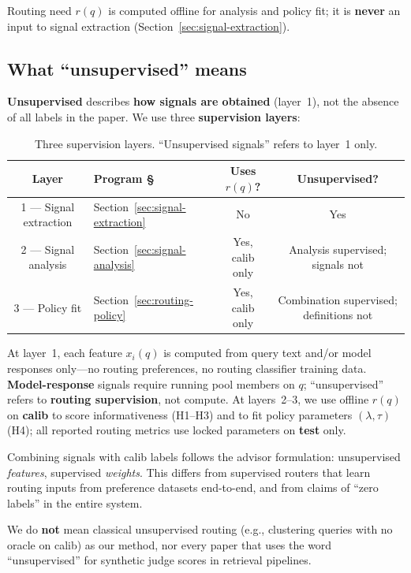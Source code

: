 Routing need $r(q)$ is computed offline for analysis and policy fit; it is \textbf{never} an input to signal extraction (Section~\ref{sec:signal-extraction}).

\subsection{What ``unsupervised'' means}
\label{sec:unsupervised-def}

\textbf{Unsupervised} describes \textbf{how signals are obtained} (layer~1), not the absence of all labels in the paper.
We use three \textbf{supervision layers}:

\begin{table}[t]
  \centering
  \small
  \begin{tabular}{@{}clcc@{}}
    \toprule
    \textbf{Layer} & \textbf{Program §} & Uses $r(q)$? & \textbf{Unsupervised?} \\
    \midrule
    1 --- Signal extraction   & Section~\ref{sec:signal-extraction} & No  & Yes \\
    2 --- Signal analysis     & Section~\ref{sec:signal-analysis}   & Yes, calib only & Analysis supervised; signals not \\
    3 --- Policy fit          & Section~\ref{sec:routing-policy}      & Yes, calib only & Combination supervised; definitions not \\
    \bottomrule
  \end{tabular}
  \caption{Three supervision layers. ``Unsupervised signals'' refers to layer~1 only.}
  \label{tab:layers}
\end{table}

At layer~1, each feature $x_i(q)$ is computed from query text and/or model responses only---no routing preferences, no routing classifier training data.
\textbf{Model-response} signals require running pool members on $q$; ``unsupervised'' refers to \textbf{routing supervision}, not compute.
At layers~2--3, we use offline $r(q)$ on \textbf{calib} to score informativeness (H1--H3) and to fit policy parameters $(\lambda,\tau)$ (H4); all reported routing metrics use locked parameters on \textbf{test} only.

Combining signals with calib labels follows the advisor formulation: unsupervised \emph{features}, supervised \emph{weights}.
This differs from supervised routers that learn routing inputs from preference datasets end-to-end, and from claims of ``zero labels'' in the entire system.

We do \textbf{not} mean classical unsupervised routing (e.g., clustering queries with no oracle on calib) as our method, nor every paper that uses the word ``unsupervised'' for synthetic judge scores in retrieval pipelines.

